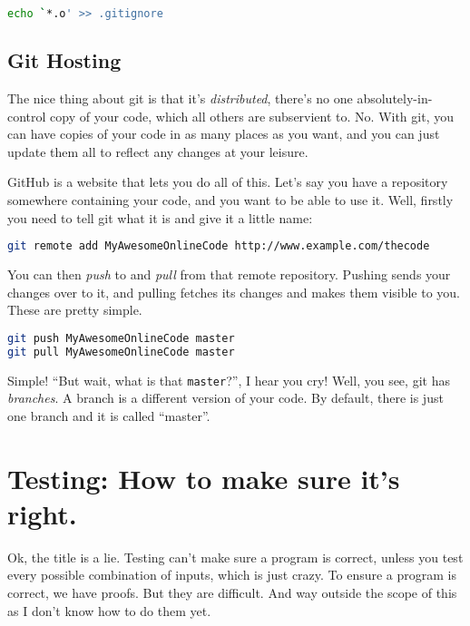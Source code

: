 \documentclass[12pt,a4paper]{article}
\begin{document}
\begin{lstlisting}[language=bash]
echo `*.o' >> .gitignore
\end{lstlisting}

\subsection{Git Hosting}

The nice thing about git is that it's \textit{distributed}, there's no
one absolutely-in-control copy of your code, which all others are
subservient to. No. With git, you can have copies of your code in as
many places as you want, and you can just update them all to reflect
any changes at your leisure.

GitHub is a website that lets you do all of this. Let's say you have a
repository somewhere containing your code, and you want to be able to
use it. Well, firstly you need to tell git what it is and give it a
little name:

\begin{lstlisting}[language=bash]
git remote add MyAwesomeOnlineCode http://www.example.com/thecode
\end{lstlisting}

You can then \textit{push} to and \textit{pull} from that remote
repository. Pushing sends your changes over to it, and pulling fetches
its changes and makes them visible to you. These are pretty simple.

\begin{lstlisting}[language=bash]
git push MyAwesomeOnlineCode master
git pull MyAwesomeOnlineCode master
\end{lstlisting}

Simple! ``But wait, what is that \texttt{master}?'', I hear you cry!
Well, you see, git has \textit{branches}. A branch is a different
version of your code. By default, there is just one branch and it is
called ``master''.

\pagebreak
\section{Testing: How to make sure it's right.}

Ok, the title is a lie. Testing can't make sure a program is correct,
unless you test every possible combination of inputs, which is just
crazy. To ensure a program is correct, we have proofs. But they are
difficult. And way outside the scope of this as I don't know how to do
them yet.
\end{document}
